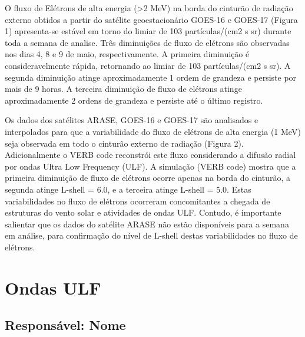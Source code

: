 \documentclass[a4paper, 10pt]{article}
\begin{document}
                     O fluxo de Elétrons de alta energia (>2 MeV) na borda do cinturão de radiação externo obtidos a partir do satélite geoestacionário GOES-16 e GOES-17 (Figura 1) apresenta-se estável em torno do limiar de 103 partículas/(cm2 s sr) durante toda a semana de analise. Três diminuições de fluxo de elétrons são observadas nos dias 4, 8 e 9 de maio, respectivamente. A primeira diminuição é consideravelmente rápida, retornando ao limiar de 103 partículas/(cm2 s sr). A segunda diminuição atinge aproximadamente 1 ordem de grandeza e persiste por mais de 9 horas. A terceira diminuição de fluxo de elétrons atinge aproximadamente 2 ordens de grandeza e persiste até o último registro. 

Os dados dos satélites ARASE, GOES-16 e GOES-17 são analisados e interpolados para que a variabilidade do fluxo de elétrons de alta energia (1 MeV) seja observada em todo o cinturão externo de radiação (Figura 2). Adicionalmente o VERB code reconstrói este fluxo considerando a difusão radial por ondas Ultra Low Frequency (ULF). A simulação (VERB code) mostra que a primeira diminuição de fluxo de elétrons ocorre apenas na borda do cinturão, a segunda atinge L-shell = 6.0, e a terceira atinge L-shell = 5.0. Estas variabilidades no fluxo de elétrons ocorreram concomitantes a chegada de estruturas do vento solar e atividades de ondas ULF. Contudo, é importante salientar que os dados do satélite ARASE não estão disponíveis para a semana em análise, para confirmação do nível de L-shell destas variabilidades no fluxo de elétrons.



\section{Ondas ULF} 
 \subsection{Responsável: Nome} 
 
\end{document}
